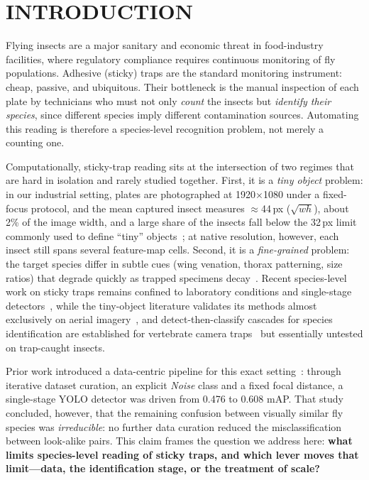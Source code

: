 \section{\uppercase{Introduction}}
\label{sec:intro}

Flying insects are a major sanitary and economic threat in food-industry facilities, where regulatory compliance requires continuous monitoring of fly populations. Adhesive (sticky) traps are the standard monitoring instrument: cheap, passive, and ubiquitous. Their bottleneck is the manual inspection of each plate by technicians who must not only \emph{count} the insects but \emph{identify their species}, since different species imply different contamination sources. Automating this reading is therefore a species-level recognition problem, not merely a counting one.

Computationally, sticky-trap reading sits at the intersection of two regimes that are hard in isolation and rarely studied together. First, it is a \emph{tiny object} problem: in our industrial setting, plates are photographed at 1920$\times$1080 under a fixed-focus protocol, and the mean captured insect measures $\approx$44\,px ($\sqrt{wh}$), about 2\% of the image width, and a large share of the insects fall below the 32\,px limit commonly used to define ``tiny'' objects~\cite{cheng2023soda}; at native resolution, however, each insect still spans several feature-map cells. Second, it is a \emph{fine-grained} problem: the target species differ in subtle cues (wing venation, thorax patterning, size ratios) that degrade quickly as trapped specimens decay~\cite{bockmann2021}. Recent species-level work on sticky traps remains confined to laboratory conditions and single-stage detectors~\cite{laekeman2025}, while the tiny-object literature validates its methods almost exclusively on aerial imagery~\cite{wang2021nwd,xu2022rfla}, and detect-then-classify cascades for species identification are established for vertebrate camera traps~\cite{beery2019} but essentially untested on trap-caught insects.

Prior work introduced a data-centric pipeline for this exact setting~\cite{pacbb2026}: through iterative dataset curation, an explicit \emph{Noise} class and a fixed focal distance, a single-stage YOLO detector was driven from 0.476 to 0.608 mAP. That study concluded, however, that the remaining confusion between visually similar fly species was \emph{irreducible}: no further data curation reduced the misclassification between look-alike pairs. This claim frames the question we address here: \textbf{what limits species-level reading of sticky traps, and which lever moves that limit---data, the identification stage, or the treatment of scale?}

